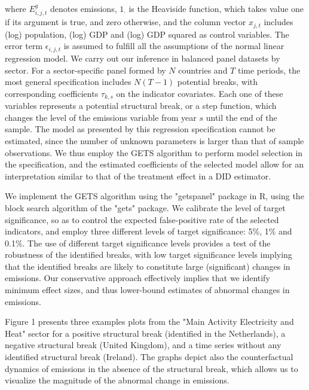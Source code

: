 \documentclass[a4paper]{article}
\begin{document}
where $E^g_{i,j,t}$ denotes emissions, 
$1_{\cdot}$ is the Heaviside function, which takes value one if its argument is true, and zero otherwise, and the column vector $x_{j,t}$ includes (log) population, (log) GDP and (log) GDP squared as control variables. The error term $\epsilon_{i,j,t}$ is assumed to fulfill all the assumptions of the normal linear regression model. We carry out our inference in balanced panel datasets by sector. For a sector-specific panel formed by $N$ countries and $T$ time periods, the most general specification includes $N(T-1)$ potential breaks, with corresponding coefficients $\tau_{k,s}$ on the indicator covariates. Each one of these variables represents a potential structural break, or a step function, which changes the level of the emissions variable from year $s$ until the end of the sample. The model as presented by this regression specification cannot be estimated, since the number of unknown parameters is larger than that of sample observations. We thus employ the GETS algorithm to perform model selection in the specification, \cite{pretis2022discovering} and the estimated coefficients of the selected model allow for an interpretation similar to that of the treatment effect in a DID estimator.

We implement the GETS algorithm using the "getspanel" package in R, \cite{getspanel} using the block search algorithm of the "gets" package.  \cite{pretis2018automated} We calibrate the level of target significance, so as to control the expected false-positive rate of the selected indicators, \cite{nielsen2018asymptotic} and employ three different levels of target significance: 5\%, 1\% and 0.1\%. The use of different target significance levels provides a test of the robustness of the identified breaks, with low target significance levels implying that the identified breaks are likely to constitute large (significant) changes in emissions. Our conservative approach effectively implies that we identify minimum effect sizes, and thus lower-bound estimates of abnormal changes in emissions.

Figure 1 presents three examples plots from the "Main Activity Electricity and Heat" sector for a positive structural break (identified in the Netherlands), a negative structural break (United Kingdom), and a time series without any identified structural break (Ireland). The graphs depict also the counterfactual dynamics of emissions in the absence of the structural break, which allows us to visualize the magnitude of the abnormal change in emissions.
\end{document}
